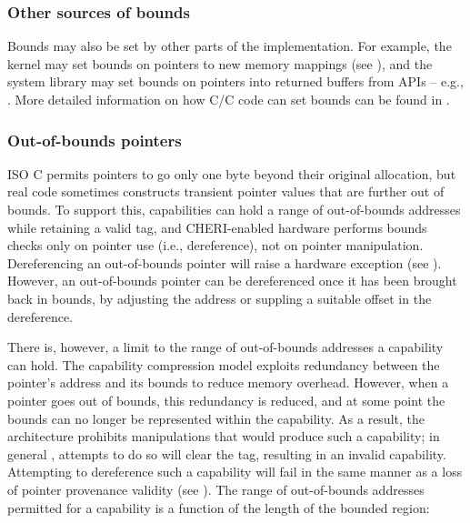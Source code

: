 \documentclass[12pt,twoside,openright,usletter]{article}
\newcommand{\ccode}[1]{{\small\ttfamily{#1}}}
\newcommand{\cfunc}[1]{{\ccode{#1()}}}
\newcommand{\note}[2]{{\color{blue}[ Note: #1 - #2]}}
\renewcommand{\note}[2]{\relax\ifhmode\unskip\fi}
\newcommand{\arnote}[1]{\note{#1}{Alex R.}}
\newcommand{\psnote}[1]{\note{#1}{Peter S.}}
\newcommand*{\cpp}[1][]{C\textsmaller[2]{\nolinebreak[4]\hspace{-.05em}\raisebox{.45ex}{\textbf{++}}}}
\begin{document}
\psnote{that seems excessively bold to me}
\psnote{what flag?}
\psnote{curious: what has to change before you think it'd be a good default?}


\subsubsection{Other sources of bounds}

Bounds may also be set by other parts of the implementation.
For example, the kernel may set bounds on pointers to new memory mappings (see
), and the system library may set bounds on pointers
into returned buffers from APIs -- e.g., \cfunc{fgetln}.
More detailed information on how C/\cpp{} code can set bounds can be found in
.

\subsubsection{Out-of-bounds pointers}
\label{sec:oob}

\note{I feel like this section wants a reference to CHERI Concentrate?}{nwf}

ISO C permits pointers to go only one byte beyond their original
allocation, but real code sometimes constructs transient pointer
values that are further out of bounds.  To support this, capabilities
can hold a range of out-of-bounds addresses while retaining a valid
tag, and CHERI-enabled hardware performs bounds checks only on pointer
use (i.e., dereference), not on pointer manipulation.  Dereferencing
an out-of-bounds pointer will raise a hardware exception (see
).  However, an out-of-bounds pointer can be
dereferenced once it has been brought back in bounds, by adjusting the
address or suppling a suitable offset in the dereference.

There is, however, a limit to the range of out-of-bounds addresses a capability can hold.
The capability compression model exploits redundancy between the pointer's address and
its bounds to reduce memory overhead.
However, when a pointer goes out of bounds, this redundancy is reduced, and at
some point the bounds can no longer be represented within the capability.
As a result, the architecture prohibits manipulations that would produce such
a capability; in general%
\psnote{slightly mysterious ``in general'' -- isn't this always true?}%
\arnote{I think the intent of this wording was to allow for trapping behaviour?}%
, attempts to do so will clear the tag, resulting in
an invalid capability.
Attempting to dereference such a capability will fail in the same
manner as a loss of pointer provenance validity (see
).
\psnote{Comment on whether that should immediately trap instead?}
The range of out-of-bounds addresses permitted for a capability is
a function of the length of the bounded region:
\end{document}
